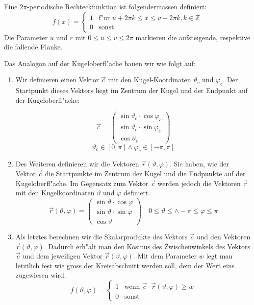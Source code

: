 \begin{refsection}
Eine $2\pi$-periodische Rechteckfunktion ist folgendermassen definiert:
\begin{equation}
f(x) =
\begin{cases}
1 & \text{f"ur } u+2\pi k \leq x \leq v + 2\pi k , k \in \mathbb{Z}
\\
0 & \text{sonst } 
\end{cases}
\label{skript:Rechteckfunktion Formel}
\end{equation}
Die Parameter $u$ und $r$ mit $0 \leq u \leq v \leq 2\pi$ markieren
die aufsteigende, respektive die fallende Flanke. 

Das Analogon auf der Kugeloberfl"ache bauen wir wie folgt auf:
\begin{enumerate}
\item Wir definieren einen Vektor $\vec{c}$ mit den Kugel-Koordinaten
$\vartheta_c$ und $\varphi_c$.
Der Startpunkt dieses Vektors liegt im Zentrum der Kugel und der
Endpunkt auf der Kugeloberfl"ache:

\begin{equation}
\vec{c} = 
\begin{pmatrix}
{\sin\vartheta_c \cdot \cos\varphi_c}\\
{\sin\vartheta_c \cdot \sin\varphi_c}\\
{\cos\vartheta_c}
\end{pmatrix}
\label{skript:Vektor c Formel}
\end{equation}
$$
\vartheta_c \in [ 0, \pi ] \wedge \varphi_c \in [ -\pi, \pi ]
$$

\item Des Weiteren definieren wir die Vektoren $\vec{r} (\vartheta, 
\varphi)$.
Sie haben, wie der Vektor $\vec{c}$ die Startpunkte im Zentrum der 
Kugel und die Endpunkte auf der Kugeloberfl"ache. 
Im Gegensatz zum Vektor $\vec{c}$ werden jedoch die Vektoren  
$\vec{r}$ mit den Kugelkoordinaten $\vartheta$ und $\varphi$ 
definiert.
\[
\vec{r} (\vartheta, \varphi) = 
\begin{pmatrix}
{\sin\vartheta \cdot \cos\varphi}\\
{\sin\vartheta \cdot \sin\varphi}\\
{\cos\vartheta}
\end{pmatrix}
\quad
0 \leq \vartheta \leq \wedge -\pi \leq \varphi \leq \pi
\]

\item Als letztes berechnen wir die Skalarprodukte des Vektors $\vec{c}$
und den Vektoren $\vec{r} (\vartheta, \varphi)$.
Dadurch erh"alt man den Kosinus des Zwischenwinkels des Vektors $\vec{c}$
und dem jeweiligen Vektor $\vec{r} (\vartheta, \varphi)$.
Mit dem Parameter $w$ legt man letztlich fest wie gross der 
Kreisabschnitt werden soll, dem der Wert eins zugewiesen wird.
\begin{equation}
f(\vartheta, \varphi) =\begin{cases}
1 & \text{wenn } \vec{c} \cdot \vec{r} (\vartheta, \varphi) \geq w\\
0 & \text{sonst}
\end{cases}
\label{skript:Kugelfunktion Formel}
\end{equation}
\end{enumerate}

\end{refsection}
